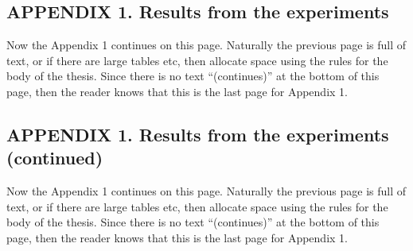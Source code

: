 \subsection*{APPENDIX 1. Results from the experiments}\label{sec:appendix1}
\par Now the Appendix 1 continues on this page. Naturally the previous page is full of text, or if there are large tables etc, then allocate space using the rules for the body of the thesis. Since there is no text ``(continues)'' at the bottom of this page, then the reader knows that this is the last page for Appendix 1.

\clearpage
\pagebreak

\subsection*{APPENDIX 1. Results from the experiments (continued)}
\par Now the Appendix 1 continues on this page. Naturally the previous page is full of text, or if there are large tables etc, then allocate space using the rules for the body of the thesis. Since there is no text ``(continues)'' at the bottom of this page, then the reader knows that this is the last page for Appendix 1.